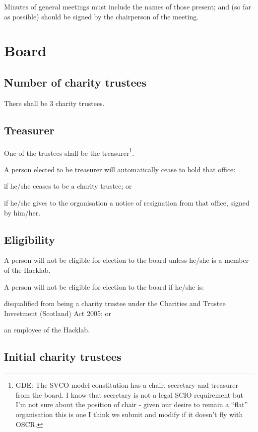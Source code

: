 \documentclass{article}
\begin{document}
\clause Minutes of general meetings must include the names of those
present; and (so far as possible) should be signed by the chairperson
of the meeting.

\section{Board}

\subsection{Number of charity trustees}

\clause There shall be 3 charity trustees.

\subsection{Treasurer}

\clause One of the trustees shall be the treasurer\footnote{GDE: The
  SVCO model constitution has a chair, secretary and treasurer from
  the board. I know that secretary is not a legal SCIO requirement but
  I'm not sure about the position of chair - given our desire to
  remain a ``flat'' organisation this is one I think we submit and
  modify if it doesn't fly with OSCR.}.

\clause A person elected to be treasurer will automatically cease to
hold that office:

\subclause if he/she ceases to be a charity trustee; or

\subclause if he/she gives to the organisation a notice of resignation
from that office, signed by him/her.

\subsection{Eligibility}

\clause A person will not be eligible for election to the board unless
he/she is a member of the Hacklab.

\clause A person will not be eligible for election to the board if
he/she is:

\subclause disqualified from being a charity trustee under the
Charities and Trustee Investment (Scotland) Act 2005; or

\subclause an employee of the Hacklab.

\subsection{Initial charity trustees}
\end{document}
